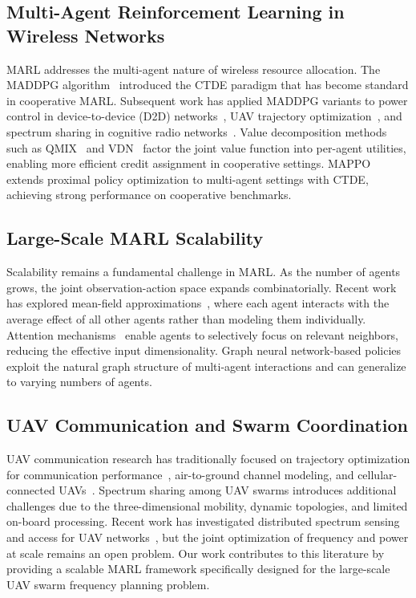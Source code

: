 \documentclass[conference]{IEEEtran}
\begin{document}
\subsection{Multi-Agent Reinforcement Learning in Wireless Networks}

MARL addresses the multi-agent nature of wireless resource allocation. The MADDPG algorithm~\cite{ref_maddpg_original} introduced the CTDE paradigm that has become standard in cooperative MARL. Subsequent work has applied MADDPG variants to power control in device-to-device (D2D) networks~\cite{ref_maddpg_d2d}, UAV trajectory optimization~\cite{ref_maddpg_uav_traj}, and spectrum sharing in cognitive radio networks~\cite{ref_maddpg_cognitive}. Value decomposition methods such as QMIX~\cite{ref_qmix} and VDN~\cite{ref_vdn} factor the joint value function into per-agent utilities, enabling more efficient credit assignment in cooperative settings. MAPPO~\cite{ref_mappo} extends proximal policy optimization to multi-agent settings with CTDE, achieving strong performance on cooperative benchmarks.

\subsection{Large-Scale MARL Scalability}

Scalability remains a fundamental challenge in MARL. As the number of agents grows, the joint observation-action space expands combinatorially. Recent work has explored mean-field approximations~\cite{ref_mean_field_marl}, where each agent interacts with the average effect of all other agents rather than modeling them individually. Attention mechanisms~\cite{ref_attention_marl} enable agents to selectively focus on relevant neighbors, reducing the effective input dimensionality. Graph neural network-based policies~\cite{ref_gnn_marl} exploit the natural graph structure of multi-agent interactions and can generalize to varying numbers of agents.

\subsection{UAV Communication and Swarm Coordination}

UAV communication research has traditionally focused on trajectory optimization for communication performance~\cite{ref_uav_com1,ref_uav_com2}, air-to-ground channel modeling, and cellular-connected UAVs~\cite{ref_uav_cellular}. Spectrum sharing among UAV swarms introduces additional challenges due to the three-dimensional mobility, dynamic topologies, and limited on-board processing. Recent work has investigated distributed spectrum sensing and access for UAV networks~\cite{ref_uav_spectrum_sensing}, but the joint optimization of frequency and power at scale remains an open problem. Our work contributes to this literature by providing a scalable MARL framework specifically designed for the large-scale UAV swarm frequency planning problem.
\end{document}
